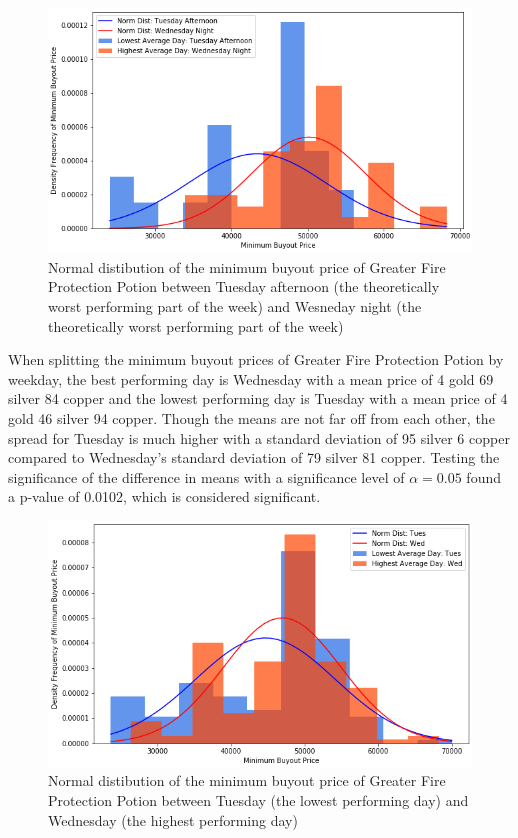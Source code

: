 \documentclass[sigconf]{acmart}
\begin{document}
\begin{figure}[h]
  \centering
  \includegraphics[width=\linewidth]{bestworst_hist}
  \caption{Normal distibution of the minimum buyout price of Greater Fire Protection Potion between Tuesday afternoon (the theoretically worst performing part of the week) and Wesneday night (the theoretically worst performing part of the week)}
\end{figure}When splitting the minimum buyout prices of Greater Fire Protection Potion by weekday, the best performing day is Wednesday with a mean price of 4 gold 69 silver 84 copper and the lowest performing day is Tuesday with a mean price of 4 gold 46 silver 94 copper. Though the means are not far off from each other, the spread for Tuesday is much higher with a standard deviation of 95 silver 6 copper compared to Wednesday’s standard deviation of 79 silver 81 copper. Testing the significance of the difference in means with a significance level of \( \alpha = 0.05 \) found a p-value of 0.0102, which is considered significant.

\begin{figure}[h]
\centering
\includegraphics[width=\linewidth]{tues_wed_hist}
\caption{Normal distibution of the minimum buyout price of Greater Fire Protection Potion between Tuesday (the lowest performing day) and Wednesday (the highest performing day)}
\end{figure}
\end{document}
